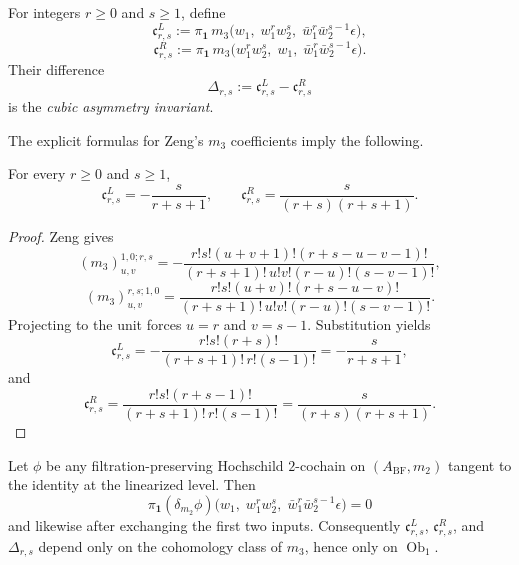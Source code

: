 \begin{definition}
\label{def:cbt-unit-projected-cubic}
For integers $r\ge0$ and $s\ge1$, define
\[
\mathfrak c^L_{r,s}:=
\pi_{\mathbf 1}\,m_3\bigl(w_1,\;w_1^rw_2^s,\;\bar w_1^r\bar w_2^{s-1}\epsilon\bigr),
\]
\[
\mathfrak c^R_{r,s}:=
\pi_{\mathbf 1}\,m_3\bigl(w_1^rw_2^s,\;w_1,\;\bar w_1^r\bar w_2^{s-1}\epsilon\bigr).
\]
Their difference
\[
\Delta_{r,s}:=\mathfrak c^L_{r,s}-\mathfrak c^R_{r,s}
\]
is the \emph{cubic asymmetry invariant}.
\end{definition}

The explicit formulas for Zeng's $m_3$ coefficients imply the following.

\begin{proposition}
\label{prop:cbt-cubic-coeffs}
\ClaimStatusProvedHere
For every $r\ge0$ and $s\ge1$,
\[
\mathfrak c^L_{r,s}=-\frac{s}{r+s+1},
\qquad
\mathfrak c^R_{r,s}=\frac{s}{(r+s)(r+s+1)}.
\]
\end{proposition}

\begin{proof}
Zeng gives
\[
(m_3)^{1,0;r,s}_{u,v}
= - \frac{r!s!(u+v+1)!(r+s-u-v-1)!}{(r+s+1)!\,u!v!(r-u)!(s-v-1)!},
\]
\[
(m_3)^{r,s;1,0}_{u,v}
= \frac{r!s!(u+v)!(r+s-u-v)!}{(r+s+1)!\,u!v!(r-u)!(s-v-1)!}.
\]
Projecting to the unit forces $u=r$ and $v=s-1$. Substitution yields
\[
\mathfrak c^L_{r,s}=-\frac{r!s!(r+s)!}{(r+s+1)!\,r!(s-1)!}
=-\frac{s}{r+s+1},
\]
and
\[
\mathfrak c^R_{r,s}=\frac{r!s!(r+s-1)!}{(r+s+1)!\,r!(s-1)!}
=\frac{s}{(r+s)(r+s+1)}.
\]
\end{proof}

\begin{theorem}
\label{thm:cbt-unit-projection-gauge-invariant}
\ClaimStatusProvedHere
Let $\phi$ be any filtration-preserving Hochschild $2$-cochain on $(A_{\mathrm{BF}},m_2)$ tangent to the identity at the linearized level. Then
\[
\pi_{\mathbf 1}(\delta_{m_2}\phi)
\bigl(w_1,\;w_1^rw_2^s,\;\bar w_1^r\bar w_2^{s-1}\epsilon\bigr)=0
\]
and likewise after exchanging the first two inputs. Consequently $\mathfrak c^L_{r,s}$, $\mathfrak c^R_{r,s}$, and $\Delta_{r,s}$ depend only on the cohomology class of $m_3$, hence only on $\operatorname{Ob}_1$.
\end{theorem}

